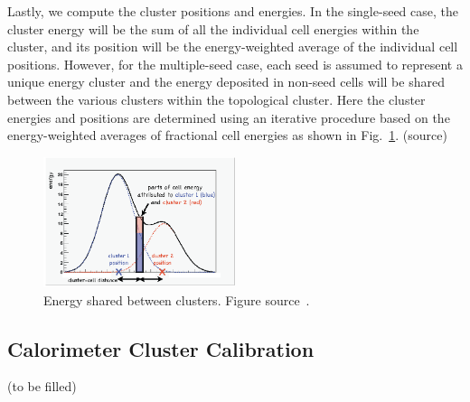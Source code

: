 Lastly, we compute the cluster positions and energies.
In the single-seed case, the cluster energy will be the sum of all the individual cell energies within the cluster, and its position will be the energy-weighted average of the individual cell positions.
However, for the multiple-seed case, each seed is assumed to represent a unique energy cluster and the energy deposited in non-seed cells will be shared between the various clusters within the topological cluster.
Here the cluster energies and positions are determined using an iterative procedure based on the energy-weighted averages of fractional cell energies as shown in Fig.~\ref{fig:clustering}. (source)

\begin{figure}[t!]
\centering
\includegraphics[width=0.50\textwidth]{figures/energy_sharing.png}
\caption[Energy shared between clusters]{Energy shared between clusters. Figure source~\cite{Clustering}.}
\label{fig:clustering}
\end{figure}

\subsection{Calorimeter Cluster Calibration}

(to be filled)
